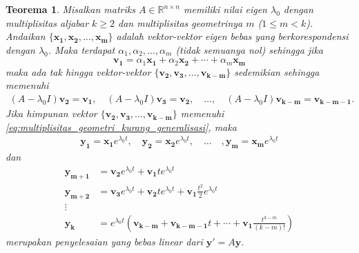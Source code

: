 \documentclass[a4paper]{article}
\theoremstyle{definisi}
\newtheorem{teorema}{Teorema}[section]
\numberwithin{equation}{section}
\newcommand{\R}{\mathbb{R}}
\begin{document}
  \begin{teorema}
    Misalkan matriks $A\in\R^{n\times n}$ memiliki nilai eigen $\lambda_0$ dengan multiplisitas aljabar $k\geq 2$ dan multiplisitas geometrinya $m$ ($1\leq m<k$). Andaikan $\{\mathbf{x_1},\mathbf{x_2},\ldots,\mathbf{x_m}\}$ adalah vektor-vektor eigen bebas yang berkorespondensi dengan $\lambda_0$. Maka terdapat $\alpha_1,\alpha_2,\ldots,\alpha_m$ (tidak semuanya nol) sehingga jika
    \begin{equation*}
      \mathbf{v_1}=\alpha_1\mathbf{x_1}+\alpha_2\mathbf{x_2}+\cdots+\alpha_m\mathbf{x_m}
    \end{equation*}
    maka ada tak hingga vektor-vektor $\{\mathbf{v_2},\mathbf{v_3},\ldots,\mathbf{v_{k-m}}\}$ sedemikian sehingga memenuhi
    \begin{equation}\label{eq:multiplisitas_geometri_kurang_generalisasi}
      \begin{split}
        (A-\lambda_0I)\mathbf{v_2}=\mathbf{v_1},\quad
        (A-\lambda_0I)\mathbf{v_3}=\mathbf{v_2}
        ,\quad\dots,\quad
        (A-\lambda_0I)\mathbf{v_{k-m}}=\mathbf{v_{k-m-1}}.
      \end{split}
    \end{equation}
    Jika himpunan vektor $\{\mathbf{v_2},\mathbf{v_3},\ldots,\mathbf{v_{k-m}}\}$ memenuhi \eqref{eq:multiplisitas_geometri_kurang_generalisasi}, maka
    \begin{equation*}
      \begin{split}
        \mathbf{y_1}=\mathbf{x_1}e^{\lambda_0t},\quad
        \mathbf{y_2}=\mathbf{x_2}e^{\lambda_0t},\quad
        \dots\quad,
        \mathbf{y_{m}}=\mathbf{x_m}e^{\lambda_0t}
      \end{split}
    \end{equation*}
    dan 
    \begin{equation}\label{eq:penyelesaian_tambahan_multiplisitas_geometri_kurang}
      \begin{split}
        \mathbf{y_{m+1}}&=\mathbf{v_2}e^{\lambda_0t}+\mathbf{v_1}te^{\lambda_0t}\\
        \mathbf{y_{m+2}}&=\mathbf{v_3}e^{\lambda_0t}+\mathbf{v_2}te^{\lambda_0t}+\mathbf{v_1}\frac{t^2}{2}e^{\lambda_0t}\\
        \vdots\\
        \mathbf{y_{k}}&=e^{\lambda_0t}\left(\mathbf{v_{k-m}}+\mathbf{v_{k-m-1}}t+\cdots+\mathbf{v_1}\frac{t^{k-m}}{(k-m)!}\right)
      \end{split}
    \end{equation}
    merupakan penyelesaian yang bebas linear dari $\mathbf{y'}=A\mathbf{y}$.
  \end{teorema}
\end{document}
